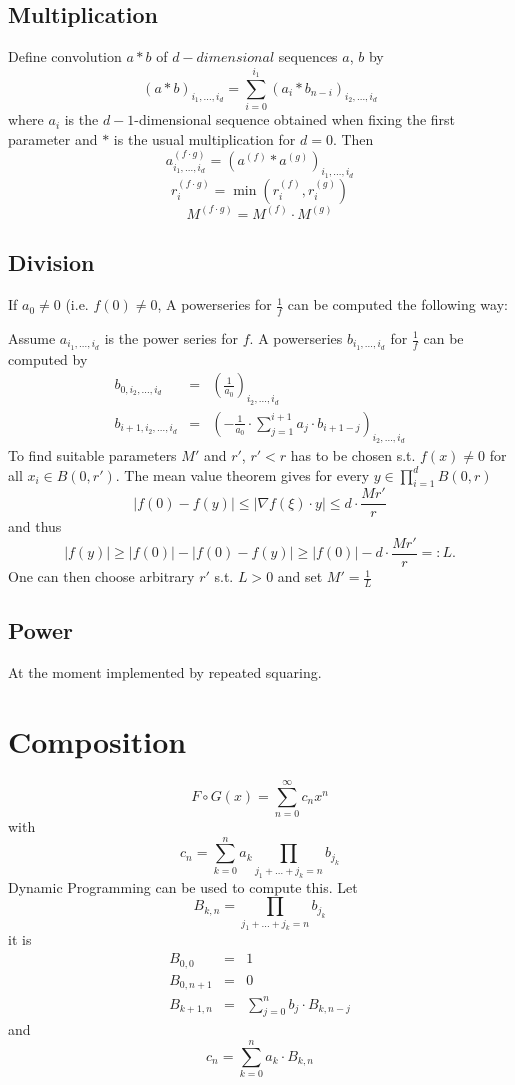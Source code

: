 \documentclass[]{article}
\newcommand{\abs}[1]{\left|#1\right|}
\begin{document}
\subsection{Multiplication}
Define convolution $a * b$ of $d-dimensional$ sequences $a$, $b$ by 
$$ (a * b)_{i_1, \dots, i_d} = \sum_{i=0}^{i_1} (a_i * b_{n-i})_{i_2, \dots, i_d} $$
where $a_i$ is the $d-1$-dimensional sequence obtained when fixing the first parameter and $*$ is the usual multiplication for $d=0$.
Then
$$a^{(f \cdot g)}_{i_1,\dots,i_d} = (a^{(f)}*a^{(g)})_{i_1, \dots, i_d}$$
$$r_i^{(f \cdot g)} = \min(r_i^{(f)}, r_i^{(g)}) $$
$$M^{(f \cdot g)} = M^{(f)} \cdot M^{(g)}$$
\subsection{Division}
If $a_0 \neq 0$ (i.e. $f(0) \neq 0$, A powerseries for $\frac{1}{f}$ can be computed the following way:

Assume $a_{i_1,\dots, i_d}$ is the power series for $f$. 
A powerseries $b_{i_1,\dots, i_d}$ for $\frac{1}{f}$ can be computed by
\begin{eqnarray*}
b_{0, i_2, \dots, i_d} &=& \left(\frac{1}{a_0}\right)_{i_2, \dots, i_d} \\
b_{i+1, i_2, \dots, i_d} &=& \left( -\frac{1}{a_0} \cdot \sum_{j=1}^{i+1}a_j \cdot b_{i+1-j}\right)_{i_2,\dots,i_d}
\end{eqnarray*}
To find suitable parameters $M'$ and $r'$, $r'<r$ has to be chosen s.t. $f(x) \neq 0$ for all $x_i \in B(0, r')$. 
The mean value theorem gives for every $y \in \prod_{i=1}^d B(0, r)$
$$ \abs{f(0)-f(y)} \leq \abs{\nabla f(\xi) \cdot y} \leq d \cdot \frac{Mr'}{r}$$
and thus
\begin{equation*}\label{divlowerbound}
\abs{f(y)} \geq \abs{f(0)}-\abs{f(0)-f(y)} \geq \abs{f(0)}-d\cdot \frac{Mr'}{r} =: L.
\end{equation*}
One can then choose arbitrary $r'$ s.t. $L > 0$ and set $M' = \frac{1}{L}$
\subsection{Power}
At the moment implemented by repeated squaring.
\section{Composition}
$$ F \circ G (x) = \sum_{n=0}^\infty c_n x^n $$
with
$$ c_n = \sum_{k=0}^n a_k \prod_{j_1+ \dots + j_k = n} b_{j_k}$$
Dynamic Programming can be used to compute this.
Let
$$ B_{k, n} = \prod_{j_1 + \dots + j_k = n} b_{j_k}$$
it is
\begin{eqnarray*}
  B_{0,0} & = & 1 \\
  B_{0, n+1} &=& 0 \\
  B_{k+1, n} &=& \sum_{j=0}^n b_j \cdot B_{k, n-j}
\end{eqnarray*}
and
$$c_n = \sum_{k=0}^n a_k \cdot B_{k,n}$$
\end{document}

